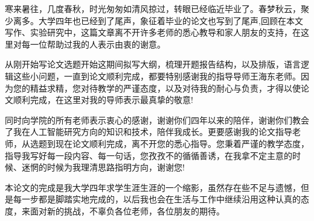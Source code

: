 \begin{acknowledgements} 
	
	寒来暑往，几度春秋，时光匆匆如清风掠过，转眼已经临近毕业了。春梦秋云，聚少离多。大学四年也已经到了尾声，象征着毕业的论文也写到了尾声,回顾在本文写作、实验研究中，这篇文章离不开许多老师的悉心教导和家人朋友的支持，在这里对每一位帮助过我的人表示由衷的谢意。
	
	从刚开始写论文选题开始这期间拟写大纲，梳理开题报告结构，以及排版，语言逻辑这些小问题，一直到论文顺利完成，都要特别感谢我的指导导师王海东老师。因为您的精益求精，您对待教学的严谨态度，以及对待我的耐心与负责，才得以使论文顺利完成，在这里对我的导师表示最真挚的敬意!
	
	同时向学院的所有老师表示衷心的感谢，谢谢你们四年以来的陪伴，谢谢你们教会了我在人工智能研究方向的知识和技术，陪伴我成长。更要感谢我的论文指导老师，从选题到现在论文顺利完成，离不开您的悉心指导。您秉着严谨的教学态度，指导我写好每一段内容、每一句话，您孜孜不的循循善诱，在我拿不定主意的时候、迷惘的时候为我理清思路指明方向，谢谢您!
	
	本论文的完成是我大学四年求学生涯生涯的一个缩影，虽然存在些不足与遗憾，但是每一步都是脚踏实地完成的，以后我也会在生活与工作中继续沿用这种认真的态度，来面对新的挑战，不辜负各位老师，各位朋友的期待。
	
\end{acknowledgements}
{\tiny }